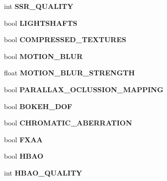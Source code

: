 \begin{DoxyCompactItemize}
\item 
int {\bfseries S\+S\+R\+\_\+\+Q\+U\+A\+L\+I\+TY}\hypertarget{class_program_data_aed82194fe658913a7ec9ec5c04ed1f7e}{}\label{class_program_data_aed82194fe658913a7ec9ec5c04ed1f7e}

\item 
bool {\bfseries L\+I\+G\+H\+T\+S\+H\+A\+F\+TS}\hypertarget{class_program_data_a99f6718558ff6410525d0342faba2fa8}{}\label{class_program_data_a99f6718558ff6410525d0342faba2fa8}

\item 
bool {\bfseries C\+O\+M\+P\+R\+E\+S\+S\+E\+D\+\_\+\+T\+E\+X\+T\+U\+R\+ES}\hypertarget{class_program_data_a90cb85227346ca2d7b9a4462b34c4b3d}{}\label{class_program_data_a90cb85227346ca2d7b9a4462b34c4b3d}

\item 
bool {\bfseries M\+O\+T\+I\+O\+N\+\_\+\+B\+L\+UR}\hypertarget{class_program_data_a5ca3aa9ef34b5837b73fdca927af2941}{}\label{class_program_data_a5ca3aa9ef34b5837b73fdca927af2941}

\item 
float {\bfseries M\+O\+T\+I\+O\+N\+\_\+\+B\+L\+U\+R\+\_\+\+S\+T\+R\+E\+N\+G\+TH}\hypertarget{class_program_data_a8f9ed202568ac9e43ae9c28092953a6b}{}\label{class_program_data_a8f9ed202568ac9e43ae9c28092953a6b}

\item 
bool {\bfseries P\+A\+R\+A\+L\+L\+A\+X\+\_\+\+O\+C\+L\+U\+S\+S\+I\+O\+N\+\_\+\+M\+A\+P\+P\+I\+NG}\hypertarget{class_program_data_a370f4fb5d3b5711de5ce208724d17d10}{}\label{class_program_data_a370f4fb5d3b5711de5ce208724d17d10}

\item 
bool {\bfseries B\+O\+K\+E\+H\+\_\+\+D\+OF}\hypertarget{class_program_data_a21747446a6ffefec92a244877fb63445}{}\label{class_program_data_a21747446a6ffefec92a244877fb63445}

\item 
bool {\bfseries C\+H\+R\+O\+M\+A\+T\+I\+C\+\_\+\+A\+B\+E\+R\+R\+A\+T\+I\+ON}\hypertarget{class_program_data_aa23f424455600c75c9fbd585fc3f20e1}{}\label{class_program_data_aa23f424455600c75c9fbd585fc3f20e1}

\item 
bool {\bfseries F\+X\+AA}\hypertarget{class_program_data_a924fca488b9024e9921541f364396c5c}{}\label{class_program_data_a924fca488b9024e9921541f364396c5c}

\item 
bool {\bfseries H\+B\+AO}\hypertarget{class_program_data_aa966b878941538d10d9a619b4af7f648}{}\label{class_program_data_aa966b878941538d10d9a619b4af7f648}

\item 
int {\bfseries H\+B\+A\+O\+\_\+\+Q\+U\+A\+L\+I\+TY}\hypertarget{class_program_data_ad001a7f8ad8017672e4d9d4a5130f8cb}{}\label{class_program_data_ad001a7f8ad8017672e4d9d4a5130f8cb}

\end{DoxyCompactItemize}


